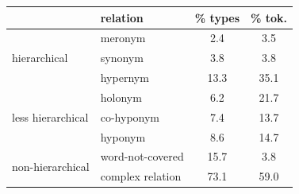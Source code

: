 \begin{table}
\small
\centering
\begin{tabular}{llcc}
\toprule
    &     relation & \% types & \% tok. \\
\midrule
\multirow{3}{*}{hierarchical} & meronym &  2.4 &  3.5 \\
& synonym &  3.8 &  3.8 \\
 & hypernym &  13.3 &  35.1 \\
 \midrule
 \multirow{3}{*}{less hierarchical} & holonym &  6.2 &  21.7 \\
& co-hyponym &  7.4 &  13.7 \\
 & hyponym &  8.6 &  14.7 \\
  \midrule
 \multirow{2}{*}{non-hierarchical} & word-not-covered &  15.7 &  3.8 \\
& complex relation &  73.1 &  59.0 \\

\bottomrule
\end{tabular}



\end{table}

